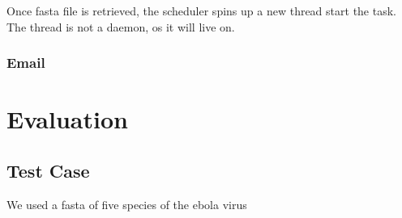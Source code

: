 \documentclass[10pt,letterpaper]{article}
\begin{document}
Once fasta file is retrieved, the scheduler spins up a new thread start the task. 
The thread is not a daemon, os it will live on.

\subsubsection{Email}




\section{Evaluation}

\subsection{Test Case}
We used a fasta of five species of the ebola virus



\end{document}

